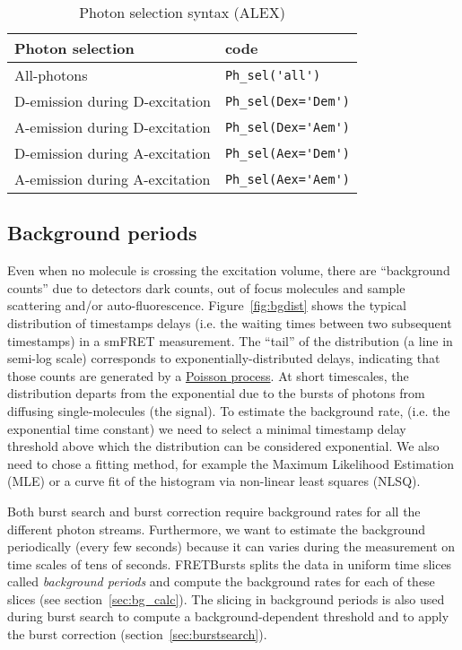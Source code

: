 \begin{table}
\begin{tabular}{l|l}
  Photon selection  & code \\
  \hline
  All-photons & \verb|Ph_sel('all')|\\
  D-emission during D-excitation & \verb|Ph_sel(Dex='Dem')|\\
  A-emission during D-excitation & \verb|Ph_sel(Dex='Aem')|\\
  D-emission during A-excitation & \verb|Ph_sel(Aex='Dem')|\\
  A-emission during A-excitation & \verb|Ph_sel(Aex='Aem')|\\
\end{tabular}
\caption{\label{tab:ph_sel_alex}Photon selection syntax (ALEX)}
\end{table}

\subsection{Background periods}
\label{sec:bg_intro}

Even when no molecule is crossing the excitation volume, there are “background counts” due to detectors dark counts, out of focus molecules and sample scattering and/or auto-fluorescence. Figure~\ref{fig:bgdist} shows the typical distribution of timestamps delays (i.e. the waiting times between two subsequent timestamps) in a smFRET measurement. The “tail” of the distribution (a line in semi-log scale) corresponds to exponentially-distributed delays, indicating that those counts are generated by a \href{http://en.wikipedia.org/wiki/Poisson_process}{Poisson process}. At short timescales, the distribution departs from the exponential due to the bursts of photons from diffusing single-molecules (the signal). To estimate the background rate, (i.e. the exponential time constant) we need to select a minimal timestamp delay threshold above which the distribution can be considered exponential. We also need to chose a fitting method, for example the Maximum Likelihood Estimation (MLE) or a curve fit of the histogram via non-linear least squares (NLSQ).

Both burst search and burst correction require background rates for all the different photon streams. Furthermore, we want to estimate the background periodically (every few seconds) because it can varies during the measurement on time scales of tens of seconds. FRETBursts splits the data in uniform time slices called \textit{background periods} and compute the background rates for each of these slices (see section~\ref{sec:bg_calc}). The slicing in background periods is also used during burst search to compute a background-dependent threshold and to apply the burst correction (section~\ref{sec:burstsearch}).

